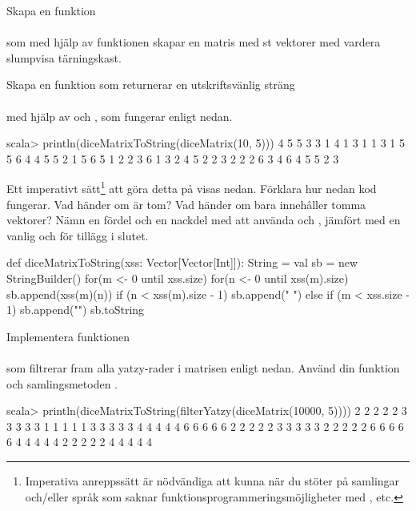 \Subtask Skapa en funktion  \\  \\ som med hjälp av funktionen  skapar en matris med  st vektorer med vardera  slumpvisa tärningskast.


\Subtask Skapa en funktion som returnerar en utskriftsvänlig sträng \\  \\med hjälp av  och , som fungerar enligt nedan.
\begin{REPL}
scala> println(diceMatrixToString(diceMatrix(10, 5)))
4 5 5 3 3
1 4 1 3 1
1 3 1 5 5
6 4 4 5 5
2 1 5 6 5
1 2 2 3 6
1 3 2 4 5
2 2 3 2 2
2 6 3 4 6
4 5 5 2 3
\end{REPL}

\Subtask Ett imperativt sätt\footnote{Imperativa anreppssätt är nödvändiga att kunna när du stöter på samlingar och/eller språk som saknar funktionsprogrammeringsmöjligheter med ,  etc.} att göra detta på visas nedan. Förklara hur nedan kod fungerar. Vad händer om  är tom? Vad händer om  bara innehåller tomma vektorer? Nämn en fördel och en nackdel med att använda  och , jämfört med en vanlig  och \code{+} för tillägg i slutet.
\begin{Code}
def diceMatrixToString(xss: Vector[Vector[Int]]): String = {
  val sb = new StringBuilder()
  for(m <- 0 until xss.size) {
    for(n <- 0 until xss(m).size) {
      sb.append(xss(m)(n))
      if (n < xss(m).size - 1) sb.append(" ")
      else if (m < xss.size - 1) sb.append("\n")
    }
  }
  sb.toString
}
\end{Code}

\Subtask Implementera funktionen \\  \\ som filtrerar fram alla yatzy-rader i matrisen  enligt nedan. Använd din funktion  och samlingsmetoden .
\begin{REPL}
scala> println(diceMatrixToString(filterYatzy(diceMatrix(10000, 5))))
2 2 2 2 2
3 3 3 3 3
1 1 1 1 1
3 3 3 3 3
4 4 4 4 4
6 6 6 6 6
2 2 2 2 2
3 3 3 3 3
2 2 2 2 2
6 6 6 6 6
4 4 4 4 4
2 2 2 2 2
4 4 4 4 4
\end{REPL}



